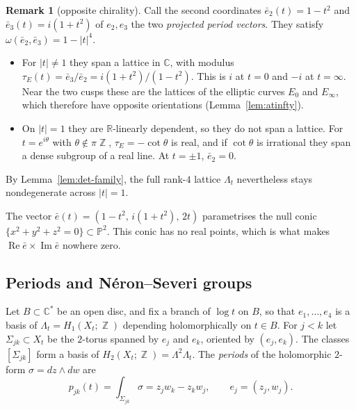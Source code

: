\documentclass{article}
\DeclareMathOperator{\Z}{\mathbb{Z}}
\theoremstyle{definition}
\newtheorem{remark}[theorem]{Remark}
\theoremstyle{plain}
\newcommand{\R}{\mathbb{R}}
\newcommand{\C}{\mathbb{C}}
\newcommand{\PP}{\mathbb{P}}
\newcommand{\eb}{\bar e}
\DeclareMathOperator{\Ima}{Im}
\DeclareMathOperator{\Rea}{Re}
\begin{document}
\begin{remark}[opposite chirality]\label{rem:chirality}
Call the second coordinates $\eb_2(t)=1-t^2$ and $\eb_3(t)=i(1+t^2)$ of $e_2,e_3$ the
two \emph{projected period vectors}. They satisfy
$\omega(\eb_2,\eb_3)=1-|t|^4$.
\begin{itemize}
\item For $|t|\ne1$ they span a lattice in $\C$, with modulus
  $\tau_E(t)=\eb_3/\eb_2=i(1+t^2)/(1-t^2)$. This is $i$ at $t=0$ and $-i$ at
  $t=\infty$. Near the two cusps these are the lattices of the elliptic curves $E_0$
  and $E_\infty$, which therefore have opposite orientations (Lemma~\ref{lem:atinfty}).
\item On $|t|=1$ they are $\R$-linearly dependent, so they do not span a lattice. For
  $t=e^{i\theta}$ with $\theta\notin\pi\Z$, $\tau_E=-\cot\theta$ is real, and if
  $\cot\theta$ is irrational they span a dense subgroup of a real line. At $t=\pm1$,
  $\eb_2=0$.
\end{itemize}
By Lemma~\ref{lem:det-family}, the full rank-$4$ lattice $\Lambda_t$ nevertheless stays
nondegenerate across $|t|=1$.

The vector $\eb(t)=(1-t^2,\,i(1+t^2),\,2t)$ parametrises the null conic
$\{x^2+y^2+z^2=0\}\subset\PP^2$. This conic has no real points, which is what makes
$\Rea\eb\times\Ima\eb$ nowhere zero.
\end{remark}

\subsection{Periods and N\'eron--Severi groups}
Let $B\subset\C^*$ be an open disc, and fix a branch of $\log t$ on $B$, so that
$e_1,\dots,e_4$ is a basis of $\Lambda_t=H_1(X_t;\Z)$ depending holomorphically on
$t\in B$. For $j<k$ let $\Sigma_{jk}\subset X_t$ be the $2$-torus spanned by $e_j$ and
$e_k$, oriented by $(e_j,e_k)$. The classes $[\Sigma_{jk}]$ form a basis of
$H_2(X_t;\Z)=\Lambda^2\Lambda_t$. The \emph{periods} of the holomorphic $2$-form
$\sigma=dz\wedge dw$ are
\[p_{jk}(t)=\int_{\Sigma_{jk}}\sigma=z_jw_k-z_kw_j,\qquad e_j=(z_j,w_j).\]
\end{document}
